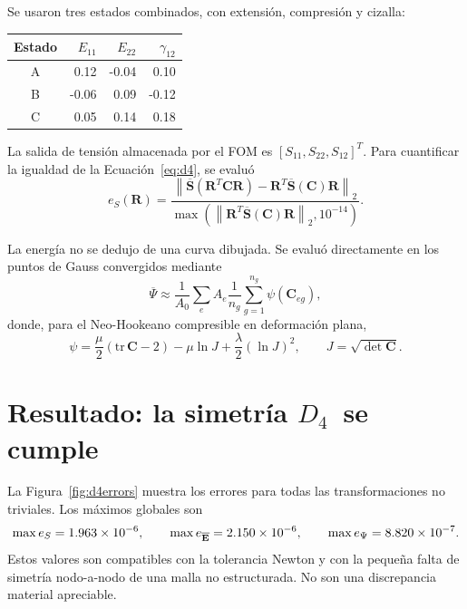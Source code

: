 \documentclass[11pt,a4paper]{article}
\newcommand{\Dfour}{\ensuremath{D_4}}
\newcommand{\Sbar}{\ensuremath{\overline{\mathbf S}}}
\newcommand{\Psibar}{\ensuremath{\overline{\Psi}}}
\begin{document}
Se usaron tres estados combinados, con extensión, compresión y cizalla:
\begin{center}
\begin{tabular}{c|rrr}
\toprule
Estado & $E_{11}$ & $E_{22}$ & $\gamma_{12}$\\
\midrule
A & 0.12 & -0.04 & 0.10\\
B & -0.06 & 0.09 & -0.12\\
C & 0.05 & 0.14 & 0.18\\
\bottomrule
\end{tabular}
\end{center}

La salida de tensión almacenada por el FOM es
$[S_{11},S_{22},S_{12}]^T$. Para cuantificar la igualdad de la
Ecuación~\eqref{eq:d4}, se evaluó
\begin{equation}
 e_S(\mathbf R)=
 \frac{\left\|\Sbar(\mathbf R^T\mathbf C\mathbf R)
 -\mathbf R^T\Sbar(\mathbf C)\mathbf R\right\|_2}
 {\max\left(\left\|\mathbf R^T\Sbar(\mathbf C)\mathbf R\right\|_2,10^{-14}\right)}.
\end{equation}

La energía no se dedujo de una curva dibujada. Se evaluó directamente en los
puntos de Gauss convergidos mediante
\begin{equation}
 \Psibar \approx \frac{1}{A_0}\sum_e A_e\frac{1}{n_g}
 \sum_{g=1}^{n_g}\psi(\mathbf C_{eg}),
\end{equation}
donde, para el Neo-Hookeano compresible en deformación plana,
\begin{equation}
 \psi = \frac{\mu}{2}\left(\mathrm{tr}\,\mathbf C-2\right)
       -\mu\ln J + \frac{\lambda}{2}(\ln J)^2,
 \qquad J=\sqrt{\det\mathbf C}.
\end{equation}

\section{Resultado: la simetría \Dfour\ se cumple}

La Figura~\ref{fig:d4errors} muestra los errores para todas las transformaciones
no triviales. Los máximos globales son
\begin{equation}
 \max e_S=1.963\times 10^{-6},
 \qquad
 \max e_{\overline{\mathbf E}}=2.150\times 10^{-6},
 \qquad
 \max e_{\Psi}=8.820\times 10^{-7}.
\end{equation}
Estos valores son compatibles con la tolerancia Newton y con la pequeña falta
de simetría nodo-a-nodo de una malla no estructurada. No son una discrepancia
material apreciable.
\end{document}
